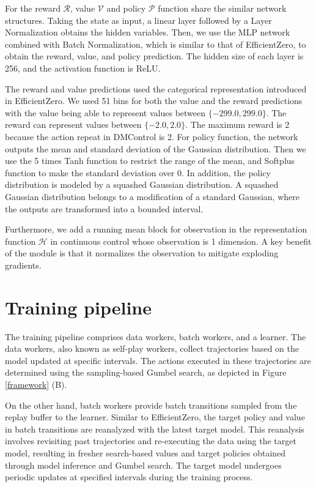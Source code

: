 For the reward $\mathcal{R}$, value $\mathcal{V}$ and policy $\mathcal{P}$ function share the similar network structures. Taking the state as input, a linear layer followed by a Layer Normalization obtains the hidden variables. Then, we use the MLP network combined with Batch Normalization, which is similar to that of EfficientZero, to obtain the reward, value, and policy prediction. The hidden size of each layer is 256, and the activation function is ReLU. 

The reward and value predictions used the categorical representation introduced in EfficientZero. We used 51 bins for both the value and the reward predictions with the value being able to represent values between $\{-299.0, 299.0\}$. The reward can represent values between $\{-2.0, 2.0\}$. The maximum reward is 2 because the action repeat in DMControl is 2.
For policy function, the network outputs the mean and standard deviation of the Gaussian distribution. Then we use the 5 times Tanh function to restrict the range of the mean, and Softplus \citep{zheng2015improving} function to make the standard deviation over 0. In addition, the policy distribution is modeled by a squashed Gaussian distribution. A squashed Gaussian distribution belongs to a modification of a standard Gaussian, where the outputs are transformed into a bounded interval. 

Furthermore, we add a running mean block for observation in the representation function $\mathcal{H}$ in continuous control whose observation is 1 dimension. A key benefit of the module is that it normalizes the observation to mitigate exploding gradients. 


\section{Training pipeline}
\label{pipeline}


The training pipeline comprises data workers, batch workers, and a learner. The data workers, also known as self-play workers, collect trajectories based on the model updated at specific intervals. The actions executed in these trajectories are determined using the sampling-based Gumbel search, as depicted in Figure \ref{framework} (B).

On the other hand, batch workers provide batch transitions sampled from the replay buffer to the learner. Similar to EfficientZero, the target policy and value in batch transitions are reanalyzed with the latest target model. This reanalysis involves revisiting past trajectories and re-executing the data using the target model, resulting in fresher search-based values and target policies obtained through model inference and Gumbel search.
The target model undergoes periodic updates at specified intervals during the training process. 

